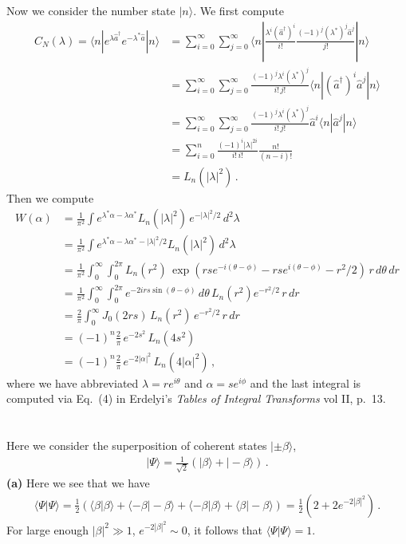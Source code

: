 \documentclass[11pt, oneside]{book}
\theoremstyle{break}
\theoremstyle{break}
\begin{document}
\newpage
Now we consider the number state $|n\rangle$. We first compute
\begin{align*}
C_N(\lambda) = \langle n | e^{\lambda \hat{a}^\dagger}e^{-\lambda^* \hat{a}}|n\rangle &= \sum_{i=0}^\infty \sum_{j=0}^\infty \langle n | \frac{\lambda^i (\hat{a}^{\dagger})^i}{i!}\frac{(-1)^j (\lambda^*)^j \hat{a}^j}{j!} |n\rangle\\
&= \sum_{i=0}^\infty \sum_{j=0}^\infty\frac{(-1)^j\lambda^{i}(\lambda^*)^j }{i!\,j!}  \langle n | (\hat{a}^{\dagger})^i\hat{a}^j |n\rangle\\
&= \sum_{i=0}^\infty \sum_{j=0}^\infty\frac{(-1)^j\lambda^{i}(\lambda^*)^j }{i!\,j!}  \hat{a}^i\langle n | \hat{a}^j |n\rangle\\
&= \sum_{i=0}^n \frac{(-1)^i |\lambda|^{2i}}{i!\,i!}\frac{n!}{(n-i)!}\\
&= L_n(|\lambda|^2)\,.
\end{align*}
Then we compute
\begin{align*}
W(\alpha) 
&= \frac{1}{\pi^2}\int e^{\lambda^* \alpha - \lambda \alpha^*}L_n(|\lambda|^2) \, e^{-|\lambda|^2/2}\, d^2\lambda\\
&= \frac{1}{\pi^2}\int e^{\lambda^* \alpha - \lambda \alpha^* - |\lambda|^2/2}L_n(|\lambda|^2) \, d^2\lambda\\
&= \frac{1}{\pi^2}\int_0^\infty \int_0^{2\pi} L_n(r^2) \, \exp(rs e^{-i (\theta-\phi)} - r s e^{i(\theta-\phi)} - r^2/2)\, r\, d\theta\, dr\\
&= \frac{1}{\pi^2}\int_0^\infty \int_0^{2\pi} e^{-2i rs \sin(\theta- \phi)}\, d\theta\, L_n(r^2) e^{-r^2/2}\, r \, dr\\
&= \frac{2}{\pi}\int_0^\infty J_0(2rs)\, L_n(r^2) \, e^{-r^2/2}\, r\, dr\\
&= (-1)^n \frac{2}{\pi}\, e^{-2s^2}\, L_n(4s^2)\\
&= (-1)^n \frac{2}{\pi}\, e^{-2|\alpha|^2}\, L_n(4|\alpha|^2)\,,
\end{align*}
where we have abbreviated $\lambda = re^{i\theta}$ and $\alpha = se^{i\phi}$ and the last integral is computed via Eq.\ (4) in Erdelyi's \textit{Tables of Integral Transforms} vol II, p.\ 13. 

\chapter{}
Here we consider the superposition of coherent states $|\pm \beta\rangle$, 
\begin{align*}
|\Psi\rangle = \frac{1}{\sqrt{
2}}\left( |\beta\rangle + |-\beta\rangle\right)\,.
\end{align*}
\textbf{(a)} Here we see that we have
\begin{align*}
\langle \Psi |\Psi\rangle = \frac{1}{2}\left( \langle \beta |\beta\rangle + \langle -\beta |-\beta\rangle + \langle -\beta |\beta\rangle + \langle \beta |-\beta\rangle\right) = \frac{1}{2}\left( 2 + 2e^{-2|\beta|^2}\right)\,.
\end{align*}
For large enough $|\beta|^2 \gg 1$, $e^{-2|\beta|^2} \sim 0$, it follows that $\langle \Psi|\Psi\rangle = 1$. \\
\end{document}
